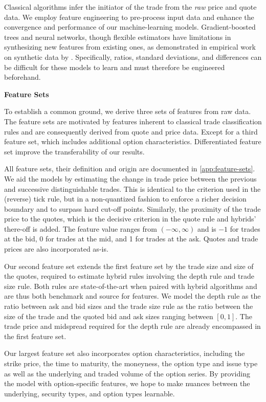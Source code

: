 Classical algorithms infer the initiator of the trade from the \emph{raw} price and quote data. We employ feature engineering to pre-process input data and enhance the convergence and performance of our machine-learning models. Gradient-boosted trees and neural networks, though flexible estimators have limitations in synthesizing new features from existing ones, as demonstrated in empirical work on synthetic data by \textcite[][5--6]{heatonEmpiricalAnalysisFeature2016}. Specifically, ratios, standard deviations, and differences can be difficult for these models to learn and must therefore be engineered beforehand.

\textbf{Feature Sets}

To establish a common ground, we derive three sets of features from raw data. The feature sets are motivated by features inherent to classical trade classification rules and are consequently derived from quote and price data. Except for a third feature set, which includes additional option characteristics. Differentiated feature set improve the transferability of our results.  

All feature sets, their definition and origin are documented in \cref{app:feature-sets}. We aid the models by estimating the change in trade price between the previous and successive distinguishable trades. This is identical to the criterion used in the (reverse) tick rule, but in a non-quantized fashion to enforce a richer decision boundary and to surpass hard cut-off points. Similarly, the proximity of the trade price to the quotes, which is the decisive criterion in the quote rule and hybrids' there-off is added. The feature value ranges from $\left(-\infty,\infty\right)$ and is $-1$ for trades at the bid, 0 for trades at the mid, and 1 for trades at the ask. Quotes and trade prices are also incorporated as-is.

Our second feature set extends the first feature set by the trade size and size of the quotes, required to estimate hybrid rules involving the depth rule and trade size rule. Both rules are state-of-the-art when paired with hybrid algorithms and are thus both benchmark and source for features. We model the depth rule as the ratio between ask and bid sizes and the trade size rule as the ratio between the size of the trade and the quoted bid and ask sizes ranging between $\left[0,1\right]$. The trade price and midspread required for the depth rule are already encompassed in the first feature set.

Our largest feature set also incorporates option characteristics, including the strike price, the time to maturity, the moneyness, the option type and issue type as well as the underlying and traded volume of the option series. By providing the model with option-specific features, we hope to make nuances between the underlying, security types, and option types learnable.


